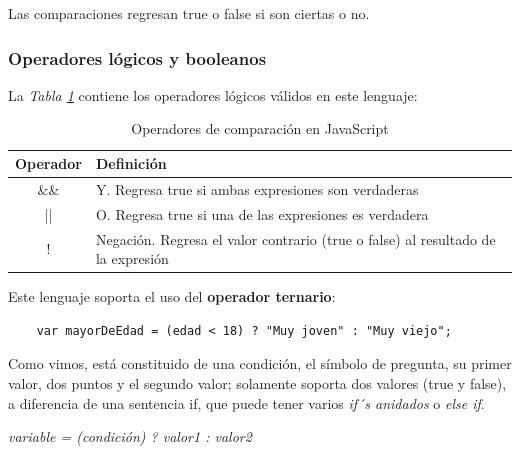 Las comparaciones regresan true o false si son ciertas o no.


\subsubsection{Operadores lógicos y booleanos}
\hspace{0.55cm}La \textit{Tabla \ref{tab: 5}} contiene los operadores lógicos válidos en este lenguaje:
\begin{table}[H]
    \begin{center}
        \caption{Operadores de comparación en JavaScript}
        \label{tab: 5}
        \begin{tabular}{c l}
            \hline
            \textbf{Operador}&\textbf{Definición} \\
            \hline
            \&\& & Y. Regresa true si ambas expresiones son verdaderas \\
            || & O. Regresa true si una de las expresiones es verdadera \\
            ! & Negación. Regresa el valor contrario (true o false) al resultado de la expresión \\
            \hline
        \end{tabular}
    \end{center}
\end{table}

Este lenguaje soporta el uso del \textbf{operador ternario}:
\begin{lstlisting}
    var mayorDeEdad = (edad < 18) ? "Muy joven" : "Muy viejo";
\end{lstlisting}

Como vimos, está constituido de una condición, el símbolo de pregunta, su primer valor, dos puntos y el segundo valor; solamente soporta dos valores (true y false), a diferencia de una sentencia if, que puede tener varios \textit{if´s anidados} o \textit{else if}.
\begin{center}
    \textit{variable = (condición) ? valor1 : valor2}
\end{center}

